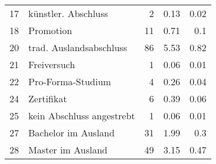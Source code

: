 \begin{longtable}{lXrrr}
        17 & \multicolumn{1}{X}{künstler. Abschluss} & %
          \num{2} &
          \num[round-mode=places,round-precision=2]{0.13} &
          \num[round-mode=places,round-precision=2]{0.02} \\

        18 & \multicolumn{1}{X}{Promotion} & %
          \num{11} &
          \num[round-mode=places,round-precision=2]{0.71} &
          \num[round-mode=places,round-precision=2]{0.1} \\

        20 & \multicolumn{1}{X}{trad. Auslandsabschluss} & %
          \num{86} &
          \num[round-mode=places,round-precision=2]{5.53} &
          \num[round-mode=places,round-precision=2]{0.82} \\

        21 & \multicolumn{1}{X}{Freiversuch} & %
          \num{1} &
          \num[round-mode=places,round-precision=2]{0.06} &
          \num[round-mode=places,round-precision=2]{0.01} \\

        22 & \multicolumn{1}{X}{Pro-Forma-Studium} & %
          \num{4} &
          \num[round-mode=places,round-precision=2]{0.26} &
          \num[round-mode=places,round-precision=2]{0.04} \\

        24 & \multicolumn{1}{X}{Zertifikat} & %
          \num{6} &
          \num[round-mode=places,round-precision=2]{0.39} &
          \num[round-mode=places,round-precision=2]{0.06} \\

        25 & \multicolumn{1}{X}{kein Abschluss angestrebt} & %
          \num{1} &
          \num[round-mode=places,round-precision=2]{0.06} &
          \num[round-mode=places,round-precision=2]{0.01} \\

        27 & \multicolumn{1}{X}{Bachelor im Ausland} & %
          \num{31} &
          \num[round-mode=places,round-precision=2]{1.99} &
          \num[round-mode=places,round-precision=2]{0.3} \\

        28 & \multicolumn{1}{X}{Master im Ausland} & %
          \num{49} &
          \num[round-mode=places,round-precision=2]{3.15} &
          \num[round-mode=places,round-precision=2]{0.47} \\


\end{longtable}
